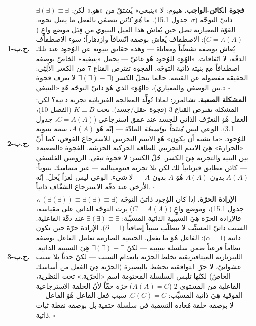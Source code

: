 \documentclass[10pt, openany, oneside]{book}
\renewcommand{\footnotesize}{\fontsize{8.5}{11}\selectfont}
\begin{document}
{\footnotesize
\noindent\begin{tabular}{r p{}}
\textbf{ح.ب-1.} & \textbf{فجوة الكائن-الواجب.} هيوم: لا «ينبغي» يُشتقّ من «هو.» لكن: $\exists(\exists) \equiv \exists$ ذاتيّ التوجّه ($\tau$، جدول 15.1). ما \textit{هُوَ كائن} يتضمّن بالفعل ما يميل نحوه. القوّة المعيارية تصل حين يُعاش هذا الميل البنيوي من قِبَل موضع واعٍ ($C = A(A)$): الاصطفاف يُعاش بوصفه اتّساقاً وازدهاراً؛ سوء الاصطفاف يُعاش بوصفه تشظّياً ومعاناة --- وهذه حقائق بنيوية عن الوُجود عند تلك الدقّة، لا اتّفاقات. «الهُوَ» للوُجود هُوَ غائيّ --- يحمل «ينبغيه» الخاصّ بوصفه اصطفافاً مع بنيته ذاتية التوجّه. الفجوة تفترض القناع 7 من الكسر الأَلِثِي: الحقيقة مفصولة عن القيمة. حالما ينحلّ الكسر ($\exists(\exists) \equiv \exists$ لا يعرف فجوة بين الوصفي والمعياري)، «الهُوَ» الذي هُوَ ذاتيّ التوجّه هُوَ «الينبغي.» $\square$ \\[0.5em]
\textbf{ح.ب-2.} & \textbf{المشكلة الصعبة.} تشالمرز: لماذا تُولِّد المعالجة الفيزيائية تجربة ذاتية؟ لكن: المشكلة تفترض القناع 3 (فجوة عقل/جسد). تحت $K \equiv B$ (الفصل 10)، العقل هُوَ التعرّف الذاتي للجسد عند عمق استرجاعي ($C = A(A)$، جدول 3.1). الوعي ليس \textit{مُنتَجاً بواسطة} المادّة --- إنّه هُوَ $A(A)$، سمة بنيوية للوُجود. «ما يشبه أن يكون» هُوَ الاسم التجريبي للاسترجاع الفوقي، كما أنّ «الحرارة» هِيَ الاسم التجريبي للطاقة الحركية الجزيئية. الفجوة «الصعبة» بين البنية والتجربة هِيَ الكسر. حُلّ الكسر: لا فجوة تبقى. الزومبي الفلسفي --- كائن مطابق فيزيائياً لك لكن بلا تجربة فينومينالية --- غير متماسك بنيوياً: $A(A)$ بدون $A(A)$ هُوَ $A$ بدون $A$ --- لا شيء. الوعي ليس لغزاً يُحلّ. إنّه الأرخي عند دقّة الاسترجاع الشفّاف ذاتياً. $\square$ \\[0.5em]
\textbf{ح.ب-3.} & \textbf{الإرادة الحرّة.} إذا كان الوُجود ذاتيّ التوجّه ($\tau(\exists(\exists)) \equiv \exists(\exists) \equiv \exists$، جدول 15.1)، وموضع واعٍ ($C = A(A)$) يرث التوجّه الذاتي على مقياسه، فالإرادة الحرّة هِيَ السببية الذاتية المسبِّبة: $\exists(\exists) \equiv \exists$ عند دقّة الفاعلية. السبب ذاتيّ المسبِّب لا يتطلّب سبباً إضافياً ($\partial = 1$). الإرادة حرّة حين تكون ذاتية ($\alpha = 1$): الفاعل هُوَ ما يفعل. الحتمية الصارمة تعامل الفاعل بوصفه نظاماً فرعياً ضمن سلسلة سببية --- لكنّ $\exists(\exists) \equiv \exists$ هِيَ السببية الذاتية. الليبرتارية الميتافيزيقية تخلط الحرّية بانعدام السبب --- لكنّ حدثاً بلا سبب عشوائيّ، لا حرّ. التوافقية تحتفظ بالبصيرة (الحرّية هِيَ الفعل من أساسك الخاصّ) لكنّها تلبس السلسلة المحتومة اسم «الحرّية.» تحت النظرية، الفاعلية من المستوى 2 ($A(A) = C$) حرّة حقّاً لأنّ الحلقة الاسترجاعية الفوقية هِيَ ذاتية المسبِّب: $C(C) = C$. سبب فعل الفاعل هُوَ الفاعل --- لا بوصفه حلقة مُعادة التسمية في سلسلة حتمية بل بوصفه نقطة ثبات ذاتية. $\square$ \\[0.3em]
\end{tabular}
}
\end{document}
